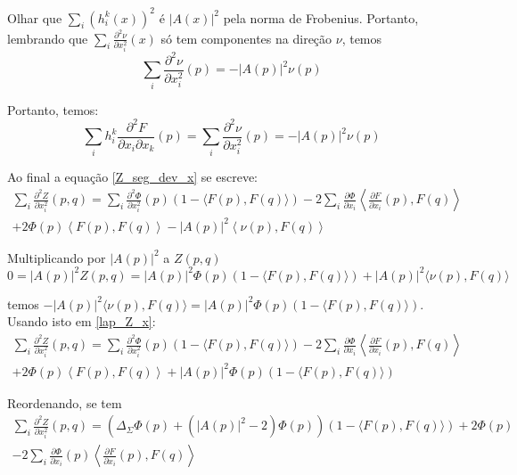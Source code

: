 \begin{demonstracao}
	Olhar que $\sum_i (h_i^k(x))^2$ é $| A(x) |^2$ pela norma de Frobenius. Portanto, lembrando que $\sum_i \frac{\partial^2 \nu}{\partial x_i^2}(x)$ só tem componentes na direção $\nu$, temos
	\begin{equation*}
		\sum_i \frac{\partial^2 \nu}{\partial x_i^2}(p) = - | A(p) |^2 \nu(p)
	\end{equation*}
	
	Portanto, temos:
	\begin{equation*}
		\sum_i h_i^k \frac{\partial^2 F}{\partial x_i \partial x_k}(p) = \sum_i \frac{\partial^2 \nu}{\partial x_i^2}(p) = - | A(p) |^2 \nu(p)
	\end{equation*}
	
	Ao final a equação \ref{Z_seg_dev_x} se escreve:
	\begin{multline}\label{lap_Z_x}
		\sum_i \frac{\partial^2 Z}{\partial x_i^2}(p,q) =  \sum_i \frac{\partial^2 \Phi}{\partial x_i^2}(p)(1 - \langle F(p), F(q) \rangle) -2  \sum_i \frac{\partial \Phi}{\partial x_i} \left\langle \frac{\partial F}{\partial x_i}(p), F(q) \right\rangle\\
		+ 2  \Phi(p) \left\langle F(p), F(q) \right\rangle - | A(p) |^2 \left\langle \nu(p), F(q) \right\rangle
	\end{multline}
	
	Multiplicando por $|A(p)|^2$ a $Z(p,q)$
	\begin{equation*}
		0 = |A(p)|^2 Z(p,q) = |A(p)|^2 \Phi(p) (1 - \langle F(p), F(q) \rangle) + |A(p)|^2 \langle \nu(p), F(q) \rangle
	\end{equation*}
	
	temos $-|A(p)|^2 \langle \nu(p), F(q) \rangle = |A(p)|^2 \Phi(p) (1 - \langle F(p), F(q) \rangle)$. Usando isto em \ref{lap_Z_x}:
	\begin{multline*}
	\sum_i \frac{\partial^2 Z}{\partial x_i^2}(p,q) =  \sum_i \frac{\partial^2 \Phi}{\partial x_i^2}(p)(1 - \langle F(p), F(q) \rangle) -2  \sum_i \frac{\partial \Phi}{\partial x_i} \left\langle \frac{\partial F}{\partial x_i}(p), F(q) \right\rangle\\
	+ 2  \Phi(p) \left\langle F(p), F(q) \right\rangle + |A(p)|^2 \Phi(p) (1 - \langle F(p), F(q) \rangle)
	\end{multline*}
	
	Reordenando, se tem
	\begin{multline*}
		\sum_i \frac{\partial^2 Z}{\partial x_i^2}(p,q) = (\Delta_{\Sigma} \Phi(p) + (|A(p)|^2 - 2)\Phi(p))(1 - \langle F(p), F(q) \rangle) + 2 \Phi(p)\\
		- 2 \sum_i \frac{\partial \Phi}{\partial x_i}(p) \left\langle \frac{\partial F}{\partial x_i}(p), F(q) \right\rangle
	\end{multline*}
	

\end{demonstracao}
